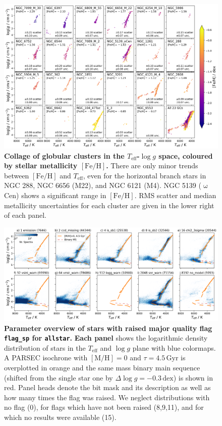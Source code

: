 \documentclass[
  journal=pasa,
  manuscript=research-paper, %
  year=2024,
  volume=37
]{cup-journal}
\newcommand{\Teff}{$T_\mathrm{eff}$\xspace}
\newcommand{\logg}{$\log g$\xspace}
\newcommand{\feh}{$\mathrm{[Fe/H]}$\xspace}
\begin{document}
\begin{figure}
\includegraphics[width=\textwidth]{figures/galah_dr4_gcs_teff_logg.png}
\caption{
\textbf{Collage of globular clusters in the \Teff-\logg space, coloured by stellar metallicity \feh.} There are only minor trends between \feh and \Teff, even for the horizontal branch stars in NGC 288, NGC 6656 (M22), and NGC 6121 (M4). NGC 5139 ($\upomega$Cen) shows a significant range in \feh. RMS scatter and median metallicity uncertainties for each cluster are given in the lower right of each panel.}
\label{fig:galah_dr4_gcs_teff_logg}
\end{figure}

\begin{figure}[ht]
 \centering
 \includegraphics[width=\textwidth]{figures/flag_sp_overview_allstar.png}
 \caption{\textbf{Parameter overview of stars with raised major quality flag \texttt{flag\_sp} for \texttt{allstar}.}
 \textbf{Each panel} shows the logarithmic density distribution of stars in the \Teff and \logg plane with blue colormaps. A PARSEC isochrone with $\mathrm{[M/H]}=0$ and $\tau = 4.5\,\mathrm{Gyr}$ is overplotted in orange and the same mass binary main sequence (shifted from the single star one by $\Delta \log g = -0.3\,\mathrm{dex}$) is shown in red. Panel heads denote the bit mask and its description as well as how many times the flag was raised. We neglect distributions with no flag (0), for flags which have not been raised (8,9,11), and for which no results were available (15).} \label{fig:flag_sp_overview_allstar}
\end{figure}
\end{document}
